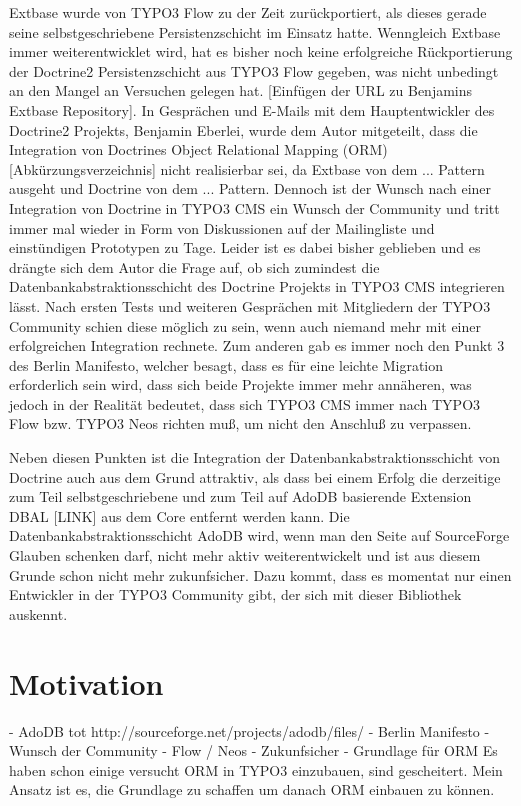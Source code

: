 Extbase wurde von TYPO3 Flow zu der Zeit zurückportiert, als dieses gerade seine selbstgeschriebene Persistenzschicht im Einsatz hatte. Wenngleich Extbase immer weiterentwicklet wird, hat es bisher noch keine erfolgreiche Rückportierung der Doctrine2 Persistenzschicht aus TYPO3 Flow gegeben, was nicht unbedingt an den Mangel an Versuchen gelegen hat. [Einfügen der URL zu Benjamins Extbase Repository]. In Gesprächen und E-Mails mit dem Hauptentwickler des Doctrine2 Projekts, Benjamin Eberlei, wurde dem Autor mitgeteilt, dass die Integration von Doctrines Object Relational Mapping (ORM) [Abkürzungsverzeichnis] nicht realisierbar sei, da Extbase von dem ... Pattern ausgeht und Doctrine von dem ... Pattern. Dennoch ist der Wunsch nach einer Integration von Doctrine in TYPO3 CMS ein Wunsch der Community und tritt immer mal wieder in Form von Diskussionen auf der Mailingliste und einstündigen Prototypen zu Tage. Leider ist es dabei bisher geblieben und 
es drängte sich dem Autor die Frage auf, ob sich zumindest die Datenbankabstraktionsschicht des Doctrine Projekts in TYPO3 CMS integrieren lässt. Nach ersten Tests und weiteren Gesprächen mit Mitgliedern der TYPO3 Community schien diese möglich zu sein, wenn auch niemand mehr mit einer erfolgreichen Integration rechnete. Zum anderen gab es immer noch den Punkt 3 des Berlin Manifesto, welcher besagt, dass es für eine leichte Migration erforderlich sein wird, dass sich beide Projekte immer mehr annäheren, was jedoch in der Realität bedeutet, dass sich TYPO3 CMS immer nach TYPO3 Flow bzw. TYPO3 Neos richten muß, um nicht den Anschluß zu verpassen.

Neben diesen Punkten ist die Integration der Datenbankabstraktionsschicht von Doctrine auch aus dem Grund attraktiv, als dass bei einem Erfolg die derzeitige zum Teil selbstgeschriebene und zum Teil auf AdoDB basierende Extension DBAL [LINK] aus dem Core entfernt werden kann. Die Datenbankabstraktionsschicht AdoDB wird, wenn man den Seite auf SourceForge Glauben schenken darf, nicht mehr aktiv weiterentwickelt und ist aus diesem Grunde schon nicht mehr zukunfsicher. Dazu kommt, dass es momentat nur einen Entwickler in der TYPO3 Community gibt, der sich mit dieser Bibliothek auskennt.
\section{Motivation}
- AdoDB tot
http://sourceforge.net/projects/adodb/files/
- Berlin Manifesto
- Wunsch der Community
- Flow / Neos
- Zukunfsicher
- Grundlage für ORM
Es haben schon einige versucht ORM in TYPO3 einzubauen, sind gescheitert. Mein Ansatz ist es, die Grundlage zu schaffen um danach ORM einbauen zu können.

